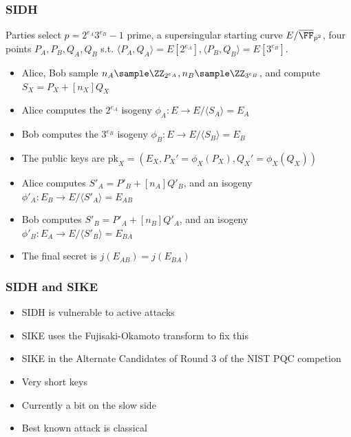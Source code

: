 \documentclass{beamer}
\begin{document}
\begin{frame}
    \frametitle{SIDH}
    Parties select $p = 2^{e_A} 3^{e_B} - 1$ prime,
    \pause a supersingular starting curve $E/\overline{\FF}_{p^2}$,
    \pause four points $P_A, P_B, Q_A, Q_B$ s.t.
    $\langle P_A, Q_A \rangle = E[2^{e_A}], \langle P_B, Q_B \rangle = E[3^{e_B}]$.
    \begin{itemize}
        \item<3-> Alice, Bob sample $n_A \sample \ZZ_{2^{e_A}}, n_B \sample \ZZ_{3^{e_B}}$, and compute $S_{X} = P_X + [n_X]Q_X$
        \item<4-> Alice computes the $2^{e_A}$ isogeny $\phi_A: E \to E/\langle S_A\rangle = E_A$
        \item<5-> Bob computes the $3^{e_B}$ isogeny $\phi_B: E \to E/\langle S_B\rangle = E_B$
        \item<6-> The public keys are $\mathrm{pk}_X = \left(E_X, P_X' = \phi_X(P_X), Q_X' = \phi_X(Q_X)\right)$
        \item<7-> Alice computes $S'_A = P'_B + [n_A] Q'_B$, and an isogeny $\phi'_A : E_B \to E/\langle S'_A \rangle = E_{AB}$
        \item<8-> Bob computes $S'_B = P'_A + [n_B] Q'_A$, and an isogeny $\phi'_B : E_A \to E/\langle S'_B \rangle = E_{BA}$
        \item<9-> The final secret is $j(E_{AB}) = j(E_{BA})$
    \end{itemize}
\end{frame}

\begin{frame}
    \frametitle{SIDH and SIKE}
    \begin{itemize}
        \item<1-> SIDH is vulnerable to active attacks
        \item<2-> SIKE uses the Fujisaki-Okamoto transform to fix this 
        \item<2-> SIKE in the Alternate Candidates of Round 3 of the NIST PQC competion
        \item<3-> Very short keys
        \item<3-> Currently a bit on the slow side
        \item<4-> Best known attack is classical
    \end{itemize} 
\end{frame}
\end{document}
